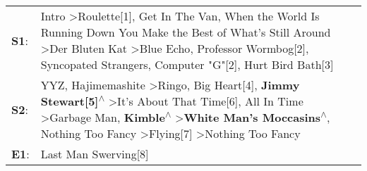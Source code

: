 \begin{supertabular}{p{0.03\textwidth}p{0.92\textwidth}}
 \textbf{S1}:  &                                                                                                                                                Intro\textsuperscript{} \textgreater \enspace Roulette[1]\textsuperscript{}, \enspace Get In The Van\textsuperscript{}, \enspace When the World Is Running Down You Make the Best of What's Still Around\textsuperscript{} \textgreater \enspace Der Bluten Kat\textsuperscript{} \textgreater \enspace Blue Echo\textsuperscript{}, \enspace Professor Wormbog[2]\textsuperscript{}, \enspace Syncopated Strangers\textsuperscript{}, \enspace Computer "G"[2]\textsuperscript{}, \enspace Hurt Bird Bath[3]\textsuperscript{}  \enspace  \\
 \textbf{S2}:  &  YYZ\textsuperscript{}, \enspace Hajimemashite\textsuperscript{} \textgreater \enspace Ringo\textsuperscript{}, \enspace Big Heart[4]\textsuperscript{}, \enspace \textbf{Jimmy Stewart[5]\textsuperscript{$\wedge$}} \textgreater \enspace It's About That Time[6]\textsuperscript{}, \enspace All In Time\textsuperscript{} \textgreater \enspace Garbage Man\textsuperscript{}, \enspace \textbf{Kimble\textsuperscript{$\wedge$}} \textgreater \enspace \textbf{White Man's Moccasins\textsuperscript{$\wedge$}}, \enspace Nothing Too Fancy\textsuperscript{} \textgreater \enspace Flying[7]\textsuperscript{} \textgreater \enspace Nothing Too Fancy\textsuperscript{}  \enspace  \\
 \textbf{E1}:  &                                                                                                                                                                                                                                                                                                                                                                                                                                                                                                                                                                                                                                         Last Man Swerving[8]\textsuperscript{}  \enspace  \\
\end{supertabular}
